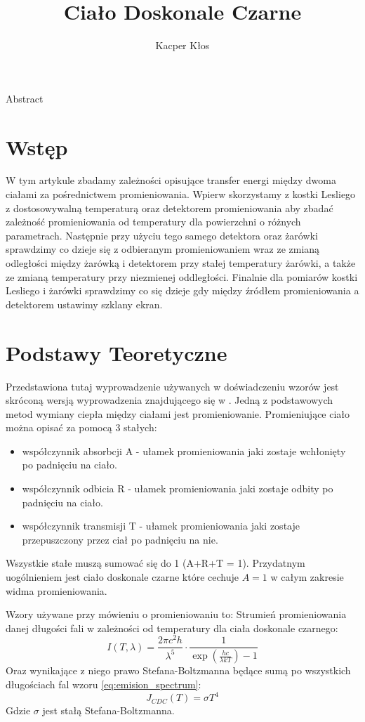 \documentclass[12pt]{article}
\title{Ciało Doskonale Czarne}
\author{Kacper Kłos}
\begin{document}
\maketitle

Abstract

\newpage
\section{Wstęp}
W tym artykule zbadamy zależności opisujące transfer energi między dwoma ciałami za pośrednictwem promieniowania. Wpierw skorzystamy z kostki Lesliego z dostosowywalną temperaturą oraz detektorem promieniowania aby zbadać zależność promieniowania od temperatury dla powierzchni o różnych parametrach. Następnie przy użyciu tego samego detektora oraz żarówki sprawdzimy co dzieje się z odbieranym promieniowaniem wraz ze zmianą odległości między żarówką i detektorem przy stałej temperatury żarówki, a także ze zmianą temperatury przy niezmienej oddległości. Finalnie dla pomiarów kostki Lesliego i żarówki sprawdzimy co się dzieje gdy między źródłem promieniowania a detektorem ustawimy szklany ekran.
\section{Podstawy Teoretyczne}
Przedstawiona tutaj wyprowadzenie używanych w doświadczeniu wzorów jest skróconą wersją wyprowadzenia znajdującego się w \cite{skrypt}.
Jedną z podstawowych metod wymiany ciepła między ciałami jest promieniowanie.
Promieniujące ciało można opisać za pomocą 3 stałych:
\begin{itemize}
    \item współczynnik absorbcji A - ułamek promieniowania jaki zostaje wchłonięty po padnięciu na ciało.
    \item współczynnik odbicia R - ułamek promieniowania jaki zostaje odbity po padnięciu na ciało.
    \item współczynnik transmisji T - ułamek promieniowania jaki zostaje przepuszczony przez ciał po padnięciu na nie.
\end{itemize}
Wszystkie stałe muszą sumować się do 1 (A+R+T = 1).
Przydatnym uogólnieniem jest ciało doskonale czarne które cechuje $A=1$ w całym zakresie widma promieniowania.

Wzory używane przy mówieniu o promieniowaniu to:
Strumień promieniowania danej długości fali w zależności od temperatury dla ciała doskonale czarnego:
\begin{equation}
    I(T, \lambda) = \frac{2\pi c^2 h}{\lambda^5} \cdot \frac{1}{\exp(\frac{hc}{\lambda k T}) -1}
    \label{eq:emision_spectrum}
\end{equation}
Oraz wynikające z niego prawo Stefana-Boltzmanna będące sumą po wszystkich długościach fal wzoru \ref{eq:emision_spectrum}:
\begin{equation}
    J_{CDC}(T) = \sigma T^4
    \label{eq:boltzman_law}
\end{equation}
Gdzie $\sigma$ jest stałą Stefana-Boltzmanna.
\end{document}
